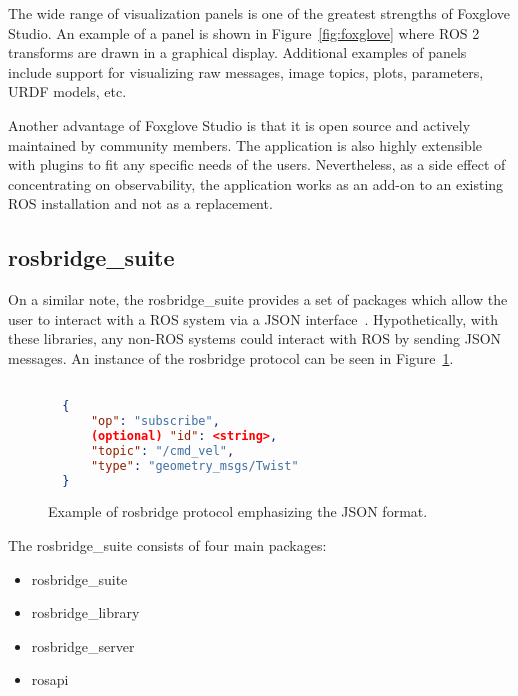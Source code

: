         The wide range of visualization panels is one of the greatest strengths of Foxglove Studio. An example of a panel is shown in Figure~\ref{fig:foxglove} where \ac{ROS} 2 transforms are drawn in a graphical display. Additional examples of panels include support for visualizing raw messages, image topics, plots, parameters, \ac{URDF} models, etc.

        Another advantage of Foxglove Studio is that it is open source and actively maintained by community members. The application is also highly extensible with plugins to fit any specific needs of the users. Nevertheless, as a side effect of concentrating on observability, the application works as an add-on to an existing ROS installation and not as a replacement.

    \subsection{\textsf{rosbridge\_suite}}

        On a similar note, the \textsf{rosbridge\_suite} provides a set of packages which allow the user to interact with a \ac{ROS} system via a \ac{JSON} interface~\cite{rosbridge}. Hypothetically, with these libraries, any non-ROS systems could interact with ROS by sending \ac{JSON} messages. An instance of the \textsf{rosbridge} protocol can be seen in Figure~\ref{fig:rosbridge}.

        \begin{figure}[htbp]
            \centering
            \begin{lstlisting}[language=JSON]

  {
      "op": "subscribe",
      (optional) "id": <string>,
      "topic": "/cmd_vel",
      "type": "geometry_msgs/Twist"
  }
            \end{lstlisting}
            \caption{Example of \textsf{rosbridge} protocol emphasizing the JSON format.}
            \label{fig:rosbridge}
        \end{figure}

        The \textsf{rosbridge\_suite} consists of four main packages:

        \begin{itemize}
            \item \textsf{rosbridge\_suite}
            \item \textsf{rosbridge\_library}
            \item \textsf{rosbridge\_server}
            \item \textsf{rosapi}
        \end{itemize}

